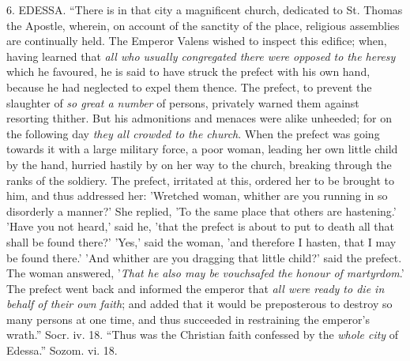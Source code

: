 6. EDESSA.
``There is in that city a magnificent church, dedicated to St. Thomas the
Apostle, wherein, on account of the sanctity of the place, religious
assemblies are continually held. The Emperor Valens wished to inspect
this edifice; when, having learned that \emph{all who usually congregated
there were opposed to the heresy} which he favoured, he is said to
have struck the prefect with his own hand, because he had neglected to
expel them thence. The prefect, to prevent the slaughter of \emph{so great
a number} of persons, privately warned them against resorting
thither. But his admonitions and menaces were alike unheeded; for on the
following day \emph{they all crowded to the church}. When the prefect
was going towards it with a large military force, a poor woman, leading
her own little child by the hand, hurried hastily by on her way to the
church, breaking through the ranks of the soldiery. The prefect,
irritated at this, ordered her to be brought to him, and thus addressed
her: 'Wretched woman, whither are you running in so disorderly a manner?'
She replied, 'To the same place that others are hastening.' 'Have you
not heard,' said he, 'that the prefect is about to put to death all that
shall be found there?' 'Yes,' said the woman, 'and therefore I hasten,
that I may be found there.' 'And whither are you dragging that little
child?' said the prefect. The woman answered, '\emph{That he also may be
vouchsafed the honour of martyrdom}.' The prefect went back and
informed the emperor that \emph{all were ready to die in behalf of their
own faith}; and added that it would be preposterous to destroy so
many persons at one time, and thus succeeded in restraining the emperor's
wrath.'' Socr. iv. 18. ``Thus was the Christian faith confessed by the \emph{whole
city} of Edessa.'' Sozom. vi. 18.

